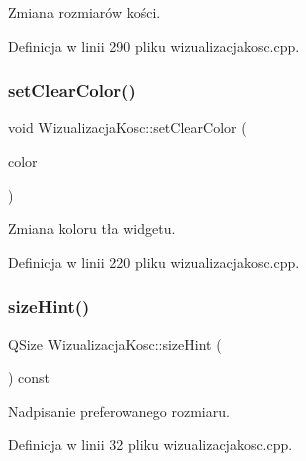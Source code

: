 Zmiana rozmiarów kości. 



Definicja w linii 290 pliku wizualizacjakosc.\+cpp.

\mbox{\label{class_wizualizacja_kosc_a3569ad7deb2d9462dfc2d152d9a7c4b7}} 
\subsubsection{\texorpdfstring{set\+Clear\+Color()}{setClearColor()}}
{\footnotesize\ttfamily void Wizualizacja\+Kosc\+::set\+Clear\+Color (\begin{DoxyParamCaption}\item[{const Q\+Color \&}]{color }\end{DoxyParamCaption})}



Zmiana koloru tła widgetu. 



Definicja w linii 220 pliku wizualizacjakosc.\+cpp.

\mbox{\label{class_wizualizacja_kosc_a24b1691336c8e00a17986a947316f96d}} 
\subsubsection{\texorpdfstring{size\+Hint()}{sizeHint()}}
{\footnotesize\ttfamily Q\+Size Wizualizacja\+Kosc\+::size\+Hint (\begin{DoxyParamCaption}{ }\end{DoxyParamCaption}) const\hspace{0.3cm}{\ttfamily [override]}}



Nadpisanie preferowanego rozmiaru. 



Definicja w linii 32 pliku wizualizacjakosc.\+cpp.

\mbox{\label{class_wizualizacja_kosc_acf840c00a6d9746acad3526c5ad9dbfc}} 
